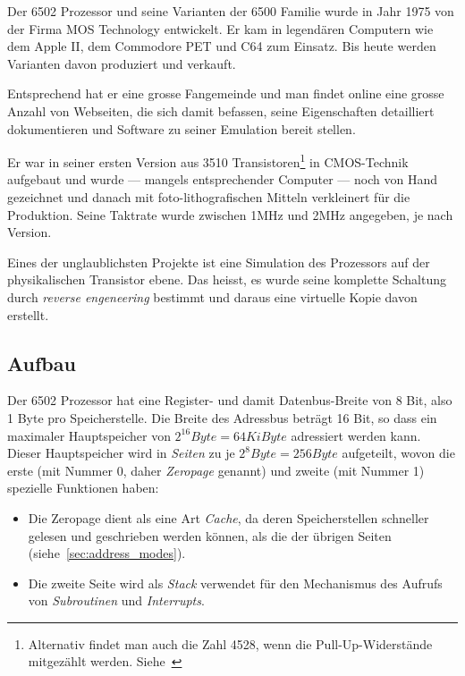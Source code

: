 \documentclass[11pt]{scrartcl}
\newcommand{\byte}{\unit{Byte}}
\begin{document}
Der 6502 Prozessor und seine Varianten der 6500 Familie wurde in Jahr
1975 von der Firma MOS Technology entwickelt. Er kam in legendären
Computern wie dem Apple II, dem Commodore PET und C64 zum Einsatz. Bis
heute werden Varianten davon produziert und verkauft.

Entsprechend hat er eine grosse Fangemeinde und man findet online eine
grosse Anzahl von Webseiten, die sich damit befassen, seine
Eigenschaften detailliert dokumentieren und Software zu seiner
Emulation bereit stellen.

Er war in seiner ersten Version aus 3510
Transistoren\footnote{Alternativ findet man auch die Zahl 4528, wenn
  die Pull-Up-Widerstände mitgezählt
  werden. Siehe~\cite{MOS6502BestLayoutGuy}} in CMOS-Technik aufgebaut
und wurde --- mangels entsprechender Computer --- noch von Hand
gezeichnet und danach mit foto-lithografischen Mitteln verkleinert für
die Produktion.  Seine Taktrate wurde zwischen 1\unit{MHz} und
2\unit{MHz} angegeben, je nach Version.

Eines der unglaublichsten Projekte ist eine Simulation des Prozessors
auf der physikalischen Transistor ebene. Das heisst, es wurde seine
komplette Schaltung durch \emph{reverse engeneering} bestimmt und
daraus eine virtuelle Kopie davon erstellt\cite*{thevisual6502}.

\subsection{Aufbau}

Der 6502 Prozessor hat eine Register- und damit Datenbus-Breite von 8
Bit, also 1 Byte pro Speicherstelle. Die Breite des Adressbus beträgt
16 Bit, so dass ein maximaler Hauptspeicher von
$2^{16}\unit{Byte} = 64 \unit{KiByte}$ adressiert werden kann. Dieser
Hauptspeicher wird in \emph{Seiten} zu je $2^8\byte=256\byte$
aufgeteilt, wovon die erste (mit Nummer 0, daher \emph{Zeropage}
genannt) und zweite (mit Nummer 1) spezielle Funktionen haben:

\begin{itemize}
\item Die Zeropage dient als eine Art \emph{Cache}, da deren
  Speicherstellen schneller gelesen und geschrieben werden können, als
  die der übrigen Seiten (siehe~\ref{sec:address_modes}).
\item Die zweite Seite wird als \emph{Stack} verwendet für den
  Mechanismus des Aufrufs von \emph{Subroutinen} und
  \emph{Interrupts}.
\end{itemize}
\end{document}
